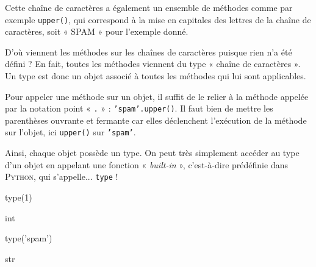 \sidegraphic[Type d'objet, données, méthodes.]{%
\footnotesize
\begin{tikzpicture}
	\draw[thick, color=firstcolor] (-0.5\marginparwidth,-22.5mm) rectangle (0.5\marginparwidth,17.5mm);
	\node[yshift=13.5mm, align=center] (type) at (0,0) {\footnotesize Objet de type « chaîne de caractère »};
	\draw[thick, color=gray] (-0.3\marginparwidth,-20mm) rectangle (0.3\marginparwidth,10mm);
	\node[yshift=5mm, align=center] (data) at (0,0) {\footnotesize \uline{Données}};
	\node[below=2pt of data, align=left] (spam) {\footnotesize \texttt{'spam'}};
	\node[yshift=-8mm, align=center] (method) at (0,0) {\footnotesize \uline{Méthodes}};
	\node[below=2pt of method, align=left] (upper) {\footnotesize \texttt{upper()} \\ \texttt{...}};
\end{tikzpicture}
\vspace{0.75pt}
\flushleft 
\begin{tabular}{@{}r@{ : }l@{}}
Appel de méthode & \texttt{>>> 'spam'\textcolor{secondcolor}{.}upper\textcolor{secondcolor}{()}}\\
Affectation & \texttt{>>> note = 1}
\end{tabular}}%
Cette chaîne de caractères a également un ensemble de méthodes comme par exemple \texttt{upper()}, qui correspond à la mise en capitales des lettres de la chaîne de caractères, soit « SPAM » pour l'exemple donné.

D'où viennent les méthodes sur les chaînes de caractères puisque rien n'a été défini ? En fait, toutes les méthodes viennent du type « chaîne de caractères ». Un type est donc un objet associé à toutes les méthodes qui lui sont applicables.

Pour appeler une méthode sur un objet, il suffit de le relier à la méthode appelée par la notation point « \texttt{.} » : \texttt{'spam'.upper()}. Il faut bien de mettre les parenthèses ouvrante et fermante car elles déclenchent l'exécution de la méthode sur l'objet, ici \texttt{upper()} sur \texttt{'spam'}.


Ainsi, chaque objet possède un type. On peut très simplement accéder au type d'un objet en appelant une fonction « \textit{built-in} », c'est-à-dire prédéfinie dans \textsc{Python}, qui s'appelle... \texttt{type} !

\begin{nbjupyterin}[before skip=6pt, after skip=1pt]{1}
type(1)
\end{nbjupyterin}
\begin{nbjupyterout}[before skip=1pt, after skip=2pt]{1}
int
\end{nbjupyterout}
\hfill
\begin{nbjupyterin}[before skip=1pt, after skip=1pt]{2}
type('spam')
\end{nbjupyterin}
\begin{nbjupyterout}[before skip=1pt, after skip=4pt]{2}
str
\end{nbjupyterout}

